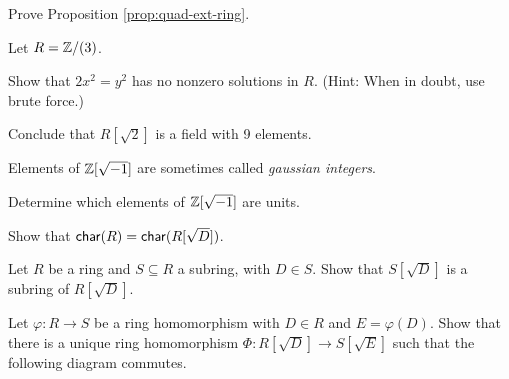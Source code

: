 \Exercises%

\begin{exercise}
Prove Proposition \ref{prop:quad-ext-ring}.
\end{exercise}

\begin{exercise}
Let \(R = \mathbb{Z}/(3)\).
\begin{proplist}
\item Show that \(2x^2 = y^2\) has no nonzero solutions in \(R\).
(Hint: When in doubt, use brute force.)
\item Conclude that \(R[\sqrt{2}]\) is a field with 9 elements.
\end{proplist}
\end{exercise}

\begin{exercise}
Elements of \(\mathbb{Z}[\sqrt{-1}]\) are sometimes called \emph{gaussian integers}.
\begin{proplist}
\item Determine which elements of \(\mathbb{Z}[\sqrt{-1}]\) are units.
\end{proplist}
\end{exercise}

\begin{exercise}
Show that \(\mathsf{char}(R) = \mathsf{char}(R[\sqrt{D}])\).
\end{exercise}

\begin{exercise}
Let \(R\) be a ring and \(S \subseteq R\) a subring, with \(D \in S\).
Show that \(S[\sqrt{D}]\) is a subring of \(R[\sqrt{D}]\).
\end{exercise}

\begin{exercise}
Let \(\varphi : R \rightarrow S\) be a ring homomorphism with \(D \in R\) and \(E = \varphi(D)\).
Show that there is a unique ring homomorphism \(\Phi : R[\sqrt{D}] \rightarrow S[\sqrt{E}]\) such that the following diagram commutes.
\begin{center}
\end{center}
\end{exercise}
